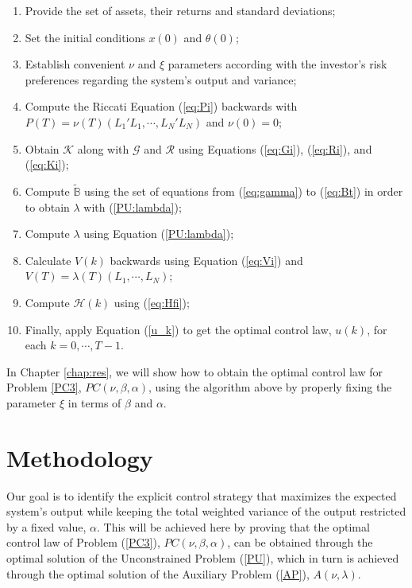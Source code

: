     \begin{enumerate}
        \item Provide the set of assets, their returns and standard deviations;

        \item Set the initial conditions $x(0)$ and $\theta(0)$;

        \item Establish convenient $\nu$ and $\xi$ parameters according with the investor's risk preferences regarding the system's output and variance;

        \item Compute the Riccati Equation (\ref{eq:Pi}) backwards with
              $P(T) = \nu(T)(L_1'L_1, \cdots, L_N'L_N)$ and $\nu(0)=0$;

        \item Obtain $\mathcal{K}$ along with $\mathcal{G}$ and $\mathcal{R}$ using
              Equations (\ref{eq:Gi}), (\ref{eq:Ri}), and (\ref{eq:Ki});

        \item Compute $\tilde{\mathbb{B}}$ using the set of equations from
              (\ref{eq:gamma}) to (\ref{eq:Bt}) in order to obtain $\lambda$ with
              (\ref{PU:lambda});
        \item Compute $\lambda$ using Equation (\ref{PU:lambda});

        \item Calculate $V(k)$ backwards using Equation (\ref{eq:Vi})
              and $V(T) = \lambda(T)(L_1, \cdots, L_N)$;

        \item Compute $\mathcal{H}(k)$ using (\ref{eq:Hfi});

        \item Finally, apply Equation (\ref{u_k}) to get the optimal control law, $u(k)$, for each $k = 0, \cdots, T-1$.
    \end{enumerate}

    In Chapter \ref{chap:res}, we will show how to obtain the optimal control law for Problem \ref{PC3}, $PC(\nu,\beta,\alpha)$, using the algorithm above by properly fixing the parameter $\xi$ in terms of $\beta$ and $\alpha$.

    \section{Methodology} \label{sec:method}

    Our goal is to identify the explicit control strategy that maximizes the expected system's output while keeping the total weighted variance of the output restricted by a fixed value, $\alpha$. This will be achieved here by proving that the optimal control law of Problem (\ref{PC3}), $PC(\nu,\beta,\alpha)$,  can be obtained through the optimal solution of the Unconstrained Problem (\ref{PU}), which in turn is achieved through the optimal solution of the Auxiliary Problem (\ref{AP}), $A(\nu, \lambda)$.

